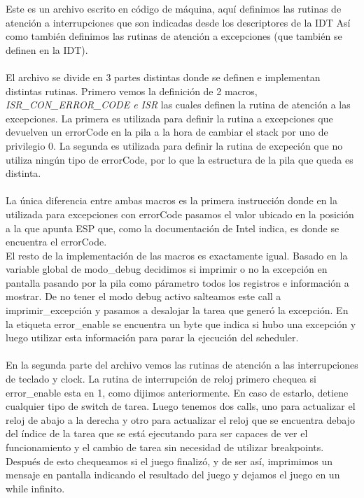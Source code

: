 Este es un archivo escrito en código de máquina, aquí definimos las rutinas de atención a interrupciones que son indicadas desde los descriptores de la IDT
Así como también definimos las rutinas de atención a excepciones (que también se definen en la IDT).
\\\\
El archivo se divide en 3 partes distintas donde se definen e implementan distintas rutinas.
Primero vemos la definición de 2 macros, \emph{ISR_CON_ERROR_CODE e ISR} las cuales definen la rutina de atención a las excepciones.
La primera es utilizada para definir la rutina a excepciones que devuelven un errorCode en la pila a la hora de cambiar el stack por uno de privilegio 0.
La segunda es utilizada para definir la rutina de excpeción que no utiliza ningún tipo de errorCode, por lo que la estructura de la pila que queda es distinta.
\\\\
La única diferencia entre ambas macros es la primera instrucción donde en la utilizada para excepciones con errorCode pasamos el valor ubicado en la posición a la que apunta ESP que, como la documentación de Intel 
indica, es donde se encuentra el errorCode.
\\
El resto de la implementación de las macros es exactamente igual. Basado en la variable global de modo_debug decidimos si imprimir o no la excepción en pantalla pasando por la pila como párametro
todos los registros e información a mostrar. De no tener el modo debug activo salteamos este call a imprimir_excepción y pasamos a desalojar la tarea que generó la excepción.
En la etiqueta error_enable se encuentra un byte que indica si hubo una excepción y luego utilizar esta información para parar la ejecución del scheduler.
\\\\
En la segunda parte del archivo vemos las rutinas de atención a las interrupciones de teclado y clock.
La rutina de interrupción de reloj primero chequea si error_enable esta en 1, como dijimos anteriormente. En caso de estarlo, detiene cualquier tipo de switch de tarea.
Luego tenemos dos calls, uno para actualizar el reloj de abajo a la derecha y otro para actualizar el reloj que se encuentra debajo del índice de la tarea que se está ejecutando para
ser capaces de ver el funcionamiento y el cambio de tarea sin necesidad de utilizar breakpoints.
\\
Después de esto chequeamos si el juego finalizó, y de ser así, imprimimos un mensaje en pantalla indicando el resultado del juego y dejamos el juego en un while infinito.
